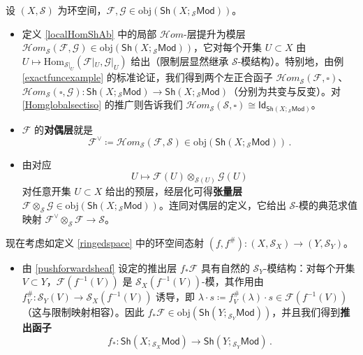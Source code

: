 \begin{Def}\label{moresheafofmodules}
设 $(X,\mathcal{S})$ 为环空间，$\mathcal{F},\mathcal{G}\in\text{obj}(\mathsf{Sh}(X;{}_\mathcal{S}\mathsf{Mod}))$。
\begin{itemize}[leftmargin=0.5cm]
	\item 定义 \ref{localHomShAb} 中的局部 $\mathcal{H}om$-层提升为模层 $\mathcal{H}om_{\mathcal{S}}(\mathcal{F},\mathcal{G})\in\text{obj}(\mathsf{Sh}(X;{}_{\mathcal{S}}\mathsf{Mod}))$，它对每个开集 $U\subset X$ 由 $U\mapsto\text{Hom}_{\mathcal{S}|_U}(\mathcal{F}|_U,\mathcal{G}|_U)$ 给出（限制层显然继承 $\mathcal{S}$-模结构）。特别地，由例 \ref{exactfuncexample} 的标准论证，我们得到两个左正合函子 $\mathcal{H}om_{\mathcal{S}}(\mathcal{F},\square)$、$\mathcal{H}om_{\mathcal{S}}(\square,\mathcal{G}):\mathsf{Sh}(X;{}_{\mathcal{S}}\mathsf{Mod})\rightarrow\mathsf{Sh}(X;{}_{\mathcal{S}}\mathsf{Mod})$（分别为共变与反变）。对 \eqref{Homglobalsectiso} 的推广则告诉我们 $\mathcal{H}om_{\mathcal{S}}(\mathcal{S},\square)\cong\mathsf{Id}_{\mathsf{Sh}(X;{}_{\mathcal{S}}\mathsf{Mod})}$。
	
	\item $\mathcal{F}$ 的\textbf{对偶层}就是 \begin{equation}
		\mathcal{F}^\vee\coloneqq \mathcal{H}om_{\mathcal{S}}(\mathcal{F},\mathcal{S})\in\text{obj}(\mathsf{Sh}(X;{}_{\mathcal{S}}\mathsf{Mod}))\,.
	\end{equation} 
	
	\item 由对应
	\begin{equation}
		U\mapsto \mathcal{F}(U)\otimes_{\mathcal{S}(U)}\mathcal{G}(U)
	\end{equation}
	对任意开集 $U\subset X$ 给出的预层，经层化可得\textbf{张量层} $\mathcal{F}\otimes_{\mathcal{S}}\mathcal{G}\in\text{obj}(\mathsf{Sh}(X;{}_{\mathcal{S}}\mathsf{Mod}))$。连同对偶层的定义，它给出 $\mathcal{S}$-模的典范求值映射 $\mathcal{F}^\vee\otimes_{\mathcal{S}}\mathcal{F}\rightarrow\mathcal{S}$。
\end{itemize}
现在考虑如定义 \ref{ringedspace} 中的环空间态射 $(f,f^\#):(X,\mathcal{S}_X)\rightarrow (Y,\mathcal{S}_Y)$。
\begin{itemize}[leftmargin=0.5cm]
	\item 由 \eqref{pushforwardsheaf} 设定的推出层 $f_*\mathcal{F}$ 具有自然的 $\mathcal{S}_Y$-模结构：对每个开集 $V\subset Y$，$\mathcal{F}(f^{-1}(V))$ 是 $\mathcal{S}_X(f^{-1}(V))$-模，其作用由 $f^\#_V:\mathcal{S}_Y(V)\rightarrow\mathcal{S}_X(f^{-1}(V))$ 诱导，即 $\lambda\cdot s\coloneqq f^\#_V(\lambda)\cdot s\in\mathcal{F}(f^{-1}(V))$（这与限制映射相容）。因此 $f_*\mathcal{F}\in\text{obj}(\mathsf{Sh}(Y;{}_{\mathcal{S}_Y}\!\mathsf{Mod}))$，并且我们得到\textbf{推出函子} \begin{equation}
		f_*:\mathsf{Sh}(X;{}_{\mathcal{S}_X}\!\mathsf{Mod})\rightarrow\mathsf{Sh}(Y;{}_{\mathcal{S}_Y}\!\mathsf{Mod})\,.
	\end{equation}
	

\end{itemize}
\end{Def}
